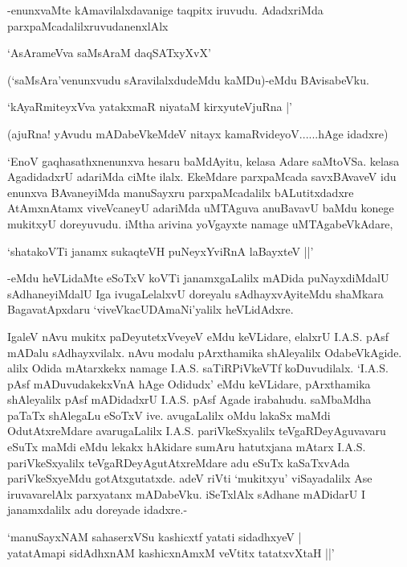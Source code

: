 -enunxvaMte kAmavilalxdavanige taqpitx iruvudu. AdadxriMda parxpaMcadalilxruvudanenxlAlx

\begin{shloka}
`AsArameVva saMsAraM daqSATxyXvX'
\end{shloka}

(`saMsAra'venunxvudu sAravilalxdudeMdu kaMDu)-eMdu BAvisabeVku.

\begin{shloka}
`kAyaRmiteyxVva yatakxmaR niyataM kirxyuteV\s juRna |'
\end{shloka}

(ajuRna! yAvudu mADabeVkeMdeV nitayx kamaRvideyoV......hAge idadxre)

`EnoV gaqhasathxnenunxva hesaru baMdAyitu, kelasa Adare saMtoVSa. kelasa AgadidadxrU adariMda ciMte ilalx. EkeMdare parxpaMcada savxBAvaveV idu enunxva BAvaneyiMda manuSayxru parxpaMcadalilx bALutitxdadxre AtAmxnAtamx viveVcaneyU adariMda uMTAguva anuBavavU baMdu konege mukitxyU doreyuvudu. iMtha arivina yoVgayxte namage uMTAgabeVkAdare,

\begin{shloka}
`shatakoVTi janamx sukaqteVH puNeyxYviRnA laBayxteV ||'
\end{shloka}

-eMdu heVLidaMte eSoTxV koVTi janamxgaLalilx mADida puNayxdiMdalU sAdhaneyiMdalU Iga ivugaLelalxvU doreyalu sAdhayxvAyiteMdu shaMkara BagavatApxdaru `viveVkacUDAmaNi'yalilx heVLidAdxre.

IgaleV nAvu mukitx paDeyutetxVveyeV eMdu keVLidare, elalxrU {\eng I.A.S.} pAsf mADalu sAdhayxvilalx. nAvu modalu pArxthamika shAleyalilx OdabeVkAgide. alilx Odida mAtarxkekx namage {\eng I.A.S.} saTiRPiVkeVTf koDuvudilalx. `{\eng I.A.S.} pAsf mADuvudakekxVnA hAge Odidudx' eMdu keVLidare, pArxthamika shAleyalilx pAsf mADidadxrU {\eng I.A.S.} pAsf Agade irabahudu. saMbaMdha paTaTx shAlegaLu eSoTxV ive. avugaLalilx oMdu lakaSx maMdi OdutAtxreMdare avarugaLalilx {\eng I.A.S.} pariVkeSxyalilx teVgaRDeyAguvavaru eSuTx maMdi eMdu lekakx hAkidare sumAru hatutxjana mAtarx {\eng I.A.S.} pariVkeSxyalilx teVgaRDeyAgutAtxreMdare adu eSuTx kaSaTxvAda pariVkeSxyeMdu gotAtxgutatxde. adeV riVti `mukitxyu' viSayadalilx Ase iruvavarelAlx parxyatanx mADabeVku. iSeTxlAlx sAdhane mADidarU I janamxdalilx adu doreyade idadxre.-

\begin{shloka}
`manuSayxNAM sahaserxVSu kashicxtf yatati sidadhxyeV |\\
yatatAmapi sidAdhxnAM kashicxnAmxM veVtitx tatatxvXtaH ||'
\end{shloka}

